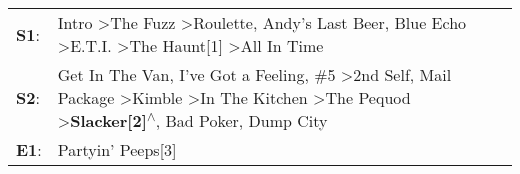 \begin{supertabular}{p{0.03\textwidth}p{0.92\textwidth}}
 \textbf{S1}:  &                                                                                                                                                Intro\textsuperscript{} \textgreater \enspace The Fuzz\textsuperscript{} \textgreater \enspace Roulette\textsuperscript{}, \enspace Andy's Last Beer\textsuperscript{}, \enspace Blue Echo\textsuperscript{} \textgreater \enspace E.T.I.\textsuperscript{} \textgreater \enspace The Haunt[1]\textsuperscript{} \textgreater \enspace All In Time\textsuperscript{}  \enspace  \\
 \textbf{S2}:  &  Get In The Van\textsuperscript{}, \enspace I've Got a Feeling\textsuperscript{}, \enspace \#5\textsuperscript{} \textgreater \enspace 2nd Self\textsuperscript{}, \enspace Mail Package\textsuperscript{} \textgreater \enspace Kimble\textsuperscript{} \textgreater \enspace In The Kitchen\textsuperscript{} \textgreater \enspace The Pequod\textsuperscript{} \textgreater \enspace \textbf{Slacker[2]\textsuperscript{$\wedge$}}, \enspace Bad Poker\textsuperscript{}, \enspace Dump City\textsuperscript{}  \enspace  \\
 \textbf{E1}:  &                                                                                                                                                                                                                                                                                                                                                                                                                                                                                 Partyin' Peeps[3]\textsuperscript{}  \enspace  \\
\end{supertabular}
